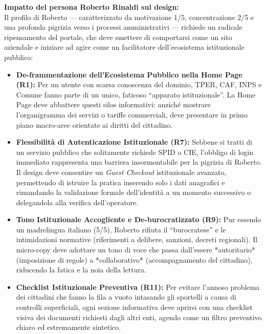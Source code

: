\documentclass[11pt,a4paper]{article}
\begin{document}
\begin{tcolorbox}[colback=backgroundColor,colframe=borderColor,arc=2mm]
    {\small
    \textbf{Impatto del persona Roberto Rinaldi sul design:} \\[4pt]
    Il profilo di Roberto --- caratterizzato da motivazione 1/5, concentrazione 2/5 e una profonda pigrizia verso i processi amministrativi --- richiede un radicale ripensamento del portale, che deve smettere di comportarsi come un sito aziendale e iniziare ad agire come un facilitatore dell'ecosistema istituzionale pubblico:
    \begin{itemize}[leftmargin=*]
        \item \textbf{De-frammentazione dell'Ecosistema Pubblico nella Home Page (R1):} Per un utente con scarsa conoscenza del dominio, TPER, CAF, INPS e Comune fanno parte di un unico, faticoso ``apparato istituzionale''. La Home Page deve abbattere questi silos informativi: anziché mostrare l'organigramma dei servizi o tariffe commerciali, deve presentare in primo piano macro-aree orientate ai diritti del cittadino.
        \item \textbf{Flessibilità di Autenticazione Istituzionale (R7):} Sebbene si tratti di un servizio pubblico che solitamente richiede SPID o CIE, l'obbligo di login immediato rappresenta una barriera insormontabile per la pigrizia di Roberto. Il design deve consentire un \textit{Guest Checkout} istituzionale avanzato, permettendo di istruire la pratica inserendo solo i dati anagrafici e rimandando la validazione formale dell'identità a un momento successivo o delegandola alla verifica dell'operatore.
        \item \textbf{Tono Istituzionale Accogliente e De-burocratizzato (R9):} Pur essendo un madrelingua italiano (5/5), Roberto rifiuta il ``burocratese'' e le intimidazioni normative (riferimenti a delibere, sanzioni, decreti regionali). Il micro-copy deve adottare un tono di voce che passa dall'essere *autoritario* (imposizione di regole) a *collaborativo* (accompagnamento del cittadino), riducendo la fatica e la noia della lettura.
        \item \textbf{Checklist Istituzionale Preventiva (R11):} Per evitare l'annoso problema dei cittadini che fanno la fila a vuoto intasando gli sportelli a causa di controlli superficiali, ogni sezione informativa deve aprirsi con una checklist visiva dei documenti richiesti dagli altri enti, agendo come un filtro preventivo chiaro ed estremamente sintetico.
    \end{itemize}
    }
\end{tcolorbox}
\end{document}
